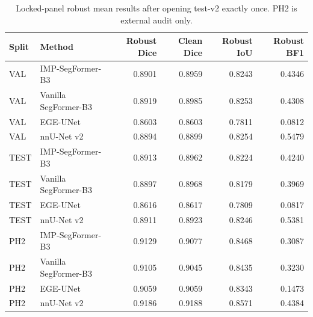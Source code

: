 \begin{table}[t]
\centering
\caption{Locked-panel robust mean results after opening test-v2 exactly once. PH2 is external audit only.}
\label{tab:locked-panel}
\begin{tabular}{llrrrr}
\toprule
Split & Method & Robust Dice & Clean Dice & Robust IoU & Robust BF1 \\
\midrule
VAL & IMP-SegFormer-B3 & 0.8901 & 0.8959 & 0.8243 & 0.4346 \\
VAL & Vanilla SegFormer-B3 & 0.8919 & 0.8985 & 0.8253 & 0.4308 \\
VAL & EGE-UNet & 0.8603 & 0.8603 & 0.7811 & 0.0812 \\
VAL & nnU-Net v2 & 0.8894 & 0.8899 & 0.8254 & 0.5479 \\
\midrule
TEST & IMP-SegFormer-B3 & 0.8913 & 0.8962 & 0.8224 & 0.4240 \\
TEST & Vanilla SegFormer-B3 & 0.8897 & 0.8968 & 0.8179 & 0.3969 \\
TEST & EGE-UNet & 0.8616 & 0.8617 & 0.7809 & 0.0817 \\
TEST & nnU-Net v2 & 0.8911 & 0.8923 & 0.8246 & 0.5381 \\
\midrule
PH2 & IMP-SegFormer-B3 & 0.9129 & 0.9077 & 0.8468 & 0.3087 \\
PH2 & Vanilla SegFormer-B3 & 0.9105 & 0.9045 & 0.8435 & 0.3230 \\
PH2 & EGE-UNet & 0.9059 & 0.9059 & 0.8343 & 0.1473 \\
PH2 & nnU-Net v2 & 0.9186 & 0.9188 & 0.8571 & 0.4384 \\
\bottomrule
\end{tabular}
\end{table}
